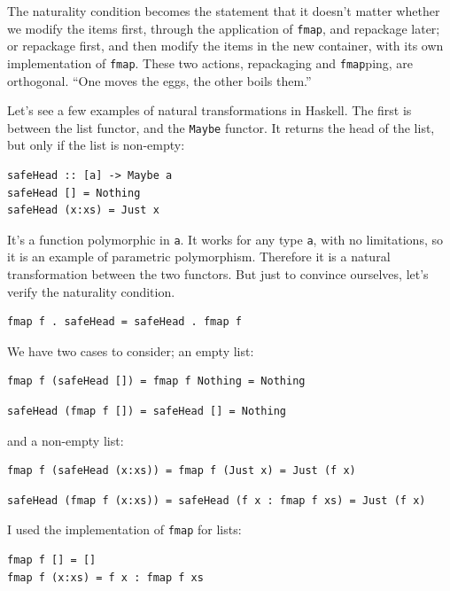The naturality condition becomes the statement that it doesn't matter
whether we modify the items first, through the application of
\texttt{fmap}, and repackage later; or repackage first, and then modify
the items in the new container, with its own implementation of
\texttt{fmap}. These two actions, repackaging and \texttt{fmap}ping, are
orthogonal. ``One moves the eggs, the other boils them.''

Let's see a few examples of natural transformations in Haskell. The
first is between the list functor, and the \texttt{Maybe} functor. It
returns the head of the list, but only if the list is non-empty:

\begin{verbatim}
safeHead :: [a] -> Maybe a
safeHead [] = Nothing
safeHead (x:xs) = Just x
\end{verbatim}

It's a function polymorphic in \texttt{a}. It works for any type
\texttt{a}, with no limitations, so it is an example of parametric
polymorphism. Therefore it is a natural transformation between the two
functors. But just to convince ourselves, let's verify the naturality
condition.

\begin{verbatim}
fmap f . safeHead = safeHead . fmap f
\end{verbatim}

We have two cases to consider; an empty list:

\begin{verbatim}
fmap f (safeHead []) = fmap f Nothing = Nothing
\end{verbatim}

\begin{verbatim}
safeHead (fmap f []) = safeHead [] = Nothing
\end{verbatim}

and a non-empty list:

\begin{verbatim}
fmap f (safeHead (x:xs)) = fmap f (Just x) = Just (f x)
\end{verbatim}

\begin{verbatim}
safeHead (fmap f (x:xs)) = safeHead (f x : fmap f xs) = Just (f x)
\end{verbatim}

I used the implementation of \texttt{fmap} for lists:

\begin{verbatim}
fmap f [] = []
fmap f (x:xs) = f x : fmap f xs
\end{verbatim}


